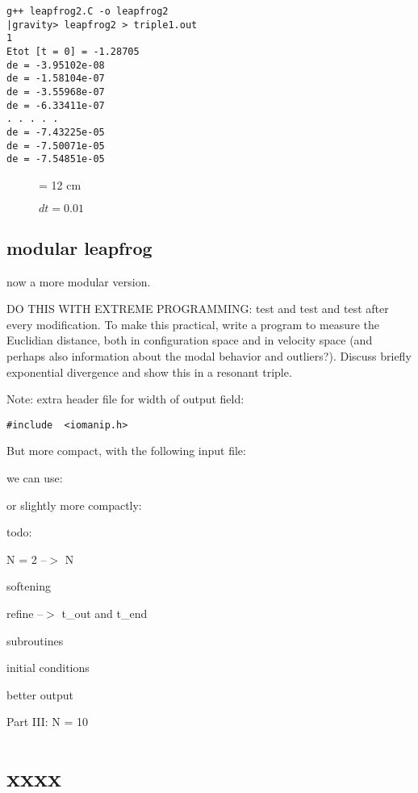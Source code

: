 \documentclass{book}
\def\code#1{{\small}}
\begin{document}
\code{leapfrog2.C}

\begin{small}
\begin{verbatim}
g++ leapfrog2.C -o leapfrog2
|gravity> leapfrog2 > triple1.out
1
Etot [t = 0] = -1.28705
de = -3.95102e-08
de = -1.58104e-07
de = -3.55968e-07
de = -6.33411e-07
. . . . .
de = -7.43225e-05
de = -7.50071e-05
de = -7.54851e-05
\end{verbatim}
\end{small}

\begin{figure}
\begin{center}
\leavevmode
\epsfxsize = 12 cm
\caption{$dt = 0.01$}
\label{fig:triple1}
\end{center}
\end{figure}

\subsection{modular leapfrog}

now a more modular version.

DO THIS WITH EXTREME PROGRAMMING: test and test and test after every
modification.  To make this practical, write a program to measure the
Euclidian distance, both in configuration space and in velocity space
(and perhaps also information about the modal behavior and outliers?).
Discuss briefly exponential divergence and show this in a resonant triple.

Note: extra header file for width of output field:

\begin{small}
\begin{verbatim}
#include  <iomanip.h>
\end{verbatim}
\end{small}

\code{leapfrog2.C}

But more compact, with the following input file:

\code{triple.in}

we can use:

\code{leapfrog3.C}

or slightly more compactly:

\code{leapfrog4.C}

todo:

N = 2 --$>$ N

softening

refine --$>$ t\_out and t\_end

subroutines

initial conditions

better output



\bigskip

\bigskip

\bigskip

\newpage

\begin{center}
{\lggb Part III: N = 10}
\end{center}

\bigskip
\bigskip

\section{xxxx}
\end{document}
